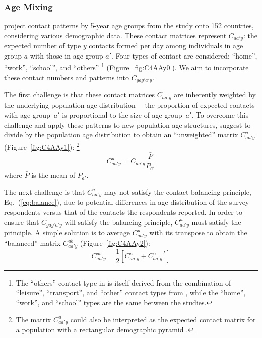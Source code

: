 \subsubsection{Age Mixing}\label{meth.prop.mix.age}
\citet{Prem2017} project contact patterns by 5-year age groups
from the \polymod study \cite{Mossong2008} onto 152 countries,
considering various demographic data.
These contact matrices represent $C_{aa'y}$:
the expected number of type $y$ contacts formed per day among
individuals in age group $a$ with those in age group $a'$.
Four types of contact are considered: ``home'', ``work'', ``school'', and ``others''%
\footnote{The ``others'' contact type in \cite{Prem2017} is itself derived from
  the combination of ``leisure'', ``transport'', and ``other'' contact types from \cite{Mossong2008},
  while the ``home'', ``work'', and ``school'' types are the same between the studies.}
(Figure~\ref{fig:C4AAy0}).
We aim to incorporate these contact numbers and patterns into $C_{gag'a'y}$.
\par
The first challenge is that these contact matrices $C_{aa'y}$ are
inherently weighted by the underlying population age distribution---%
the proportion of expected contacts with age group~$a'$ is proportional to the size of age group~$a'$.
To overcome this challenge and apply these patterns to new population age structures,
\citet{Arregui2018} suggest to divide by the population age distribution
to obtain an ``unweighted'' matrix $C^u_{aa'y}$ (Figure~\ref{fig:C4AAy1}):%
\footnote{The matrix $C^u_{aa'y}$ could also be interpreted as
  the expected contact matrix for a population with a rectangular demographic pyramid \cite{Arregui2018}.}
\begin{equation}\label{eq:C^u}
  C^u_{aa'y} = C_{aa'y} \frac{\bar{P}}{P_{a'}}
\end{equation}
where $\bar{P}$ is the mean of $P_{a'}$.
\par
The next challenge is that $C^u_{aa'y}$ may not satisfy
the contact balancing principle, Eq.~(\ref{eq:balance}),
due to potential differences in age distribution of
the \polymod survey respondents versus that of the contacts the respondents reported.
In order to ensure that $C_{gag'a'y}$ will satisfy the balancing principle,
$C^u_{aa'y}$ must satisfy the principle.
A simple solution is to average $C^u_{aa'y}$ with its transpose
to obtain the ``balanced'' matrix $C^{ub}_{aa'y}$ (Figure~\ref{fig:C4AAy2}):
\begin{equation}\label{eq:C^ub}
  C^{ub}_{aa'y} = \frac{1}{2}\left[C^u_{aa'y} + {C^u_{aa'y}}^{T}\right]
\end{equation}
